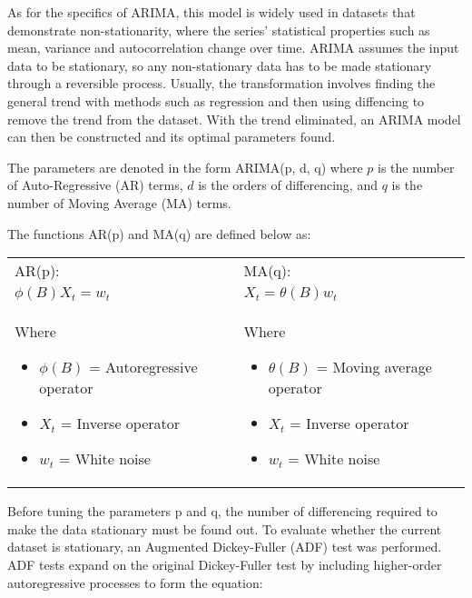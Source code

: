 As for the specifics of ARIMA, this model is widely used in datasets that demonstrate non-stationarity, where the series' statistical properties such as
mean, variance and autocorrelation change over time. ARIMA assumes the input data to
be stationary, so any non-stationary data has to be made stationary through a reversible
process. Usually, the transformation involves finding the general trend with methods such as
regression and then using diffencing to remove the trend from the dataset. With the trend
eliminated, an ARIMA model can then be constructed and its optimal parameters found.

The parameters are denoted in the form ARIMA(p, d, q) where $p$ is the
number of Auto-Regressive (AR) terms, $d$ is the orders of differencing, and $q$ is the number
of Moving Average (MA) terms.

The functions AR(p) and MA(q) are defined below as:


\begin{tabular}{|*2{p{}|}}
    \hline
    AR(p):                       & MA(q):                   \\
    \quad ${\phi (B) X_t = w_t}$ & ${X_t = \theta (B) w_t}$ \\[\baselineskip]
    Where
    \begin{itemize}[nosep]
        \item ${\phi (B)}$ = Autoregressive operator
        \item ${X_t}$ = Inverse operator
        \item ${w_t}$ = White noise
    \end{itemize}
    &
    Where
    \begin{itemize}[nosep]
        \item ${\theta (B)}$ = Moving average operator
        \item ${X_t}$ = Inverse operator
        \item ${w_t}$ = White noise
    \end{itemize}
    \\
    \hline
\end{tabular}

Before tuning the parameters p and q, the number of differencing required to make the
data stationary must be found out. To evaluate whether the current dataset is stationary, an
Augmented Dickey-Fuller (ADF) test was performed.
ADF tests expand on the original Dickey-Fuller test by including higher-order autoregressive
processes to form the equation:


